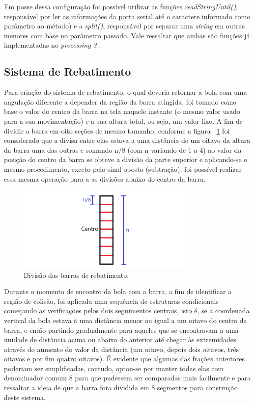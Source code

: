 \documentclass[conference]{IEEEtran}
\newcommand\largurafig{9cm}
\begin{document}
Em posse dessa configuração foi possível utilizar as funções \emph{readStringUntil()}, responsável por ler as informações da porta serial até o caractere informado como parâmetro ao método) e a \emph{split()}, responsável por separar uma \emph{string} em outras menores com base no parâmetro passado. Vale ressaltar que ambas são funções já implementadas no \emph{processing 3} \cite{ProcessingHomepage}.

\subsection{Sistema de Rebatimento}
Para criação do sistema de rebatimento, o qual deveria retornar a bola com uma angulação diferente a depender da região da barra atingida, foi tomado como base o valor do centro da barra na tela naquele instante (o mesmo valor usado para a sua movimentação) e a sua altura total, ou seja, um valor fixo. A fim de dividir a barra em oito seções de mesmo tamanho, conforme a figura ~\ref{fig:barra_dividida} foi considerado que a divisa entre elas estava a uma distância de um oitavo da altura da barra uma das outras e somando n/8 (com n variando de 1 a 4) ao valor da posição do centro da barra se obteve a divisão da parte superior e aplicando-se o mesmo procedimento, exceto pelo sinal oposto (subtração), foi possível realizar essa mesma operação para a as divisões abaixo do centro da barra.

\begin{figure}[htbp]
\centerline{
    \includegraphics[width = \largurafig]{images/barra_dividida.png}
    }
\caption{Divisão das barras de rebatimento.}
\label{fig:barra_dividida}
\end{figure}

Durante o momento de encontro da bola com a barra, a fim de identificar a região de colisão, foi aplicada uma sequência de estruturas condicionais começando as verificações pelos dois seguimentos centrais, isto é, se a coordenada vertical da bola estava à uma distância menor ou igual a um oitavo do centro da barra, e então partindo gradualmente para aqueles que se encontravam a uma unidade de distância acima ou abaixo do anterior até chegar às extremidades através do aumento do valor da distância (um oitavo, depois dois oitavos, três oitavos e por fim quatro oitavos). É evidente que algumas das frações anteriores poderiam ser simplificadas, contudo, optou-se por manter todas elas com denominador comum 8 para que pudessem ser comparadas mais facilmente e para ressaltar a ideia de que a barra fora dividida em 8 segmentos para construção deste sistema.
\end{document}
